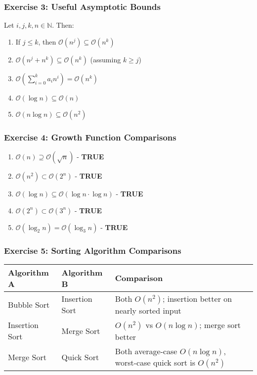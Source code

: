 \documentclass{article}
\begin{document}
\subsubsection{Exercise 3: Useful Asymptotic Bounds}
Let $i, j, k, n \in \mathbb{N}$. Then:
\begin{enumerate}
    \item If $j \le k$, then $\mathcal{O}(n^j) \subseteq \mathcal{O}(n^k)$
    \item $\mathcal{O}(n^j + n^k) \subseteq \mathcal{O}(n^k)$ (assuming $k \geq j$)
    \item $\mathcal{O}\left(\sum_{i=0}^{k} a_i n^i\right) = \mathcal{O}(n^k)$
    \item $\mathcal{O}(\log n) \subseteq \mathcal{O}(n)$
    \item $\mathcal{O}(n \log n) \subseteq \mathcal{O}(n^2)$
\end{enumerate}

\subsubsection{Exercise 4: Growth Function Comparisons}
\begin{enumerate}
    \item $\mathcal{O}(n) \supseteq \mathcal{O}(\sqrt{n})$ - \textbf{TRUE}
    \item $\mathcal{O}(n^2) \subset \mathcal{O}(2^n)$ - \textbf{TRUE}
    \item $\mathcal{O}(\log n) \subseteq \mathcal{O}(\log n \cdot \log n)$ - \textbf{TRUE}
    \item $\mathcal{O}(2^n) \subset \mathcal{O}(3^n)$ - \textbf{TRUE}
    \item $\mathcal{O}(\log_2 n) = \mathcal{O}(\log_3 n)$ - \textbf{TRUE}
\end{enumerate}

\subsubsection{Exercise 5: Sorting Algorithm Comparisons}
\begin{center}
\begin{tabular}{|l|l|l|}
\hline
\textbf{Algorithm A} & \textbf{Algorithm B} & \textbf{Comparison} \\
\hline
Bubble Sort & Insertion Sort & Both $O(n^2)$; insertion better on nearly sorted input \\
Insertion Sort & Merge Sort & $O(n^2)$ vs $O(n \log n)$; merge sort better \\
Merge Sort & Quick Sort & Both average-case $O(n \log n)$, worst-case quick sort is $O(n^2)$ \\
\hline
\end{tabular}
\end{center}
\end{document}
